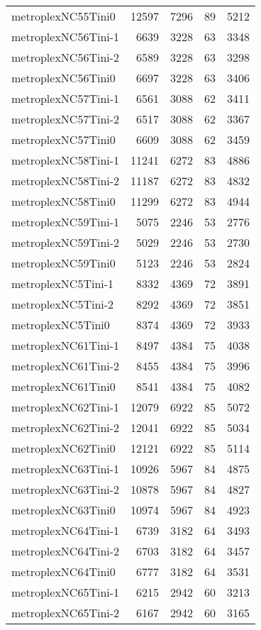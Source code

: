 \begin{longtable}{lrrrr}
metroplexNC55Tini0 & 12597 & 7296 & 89 & 5212 \\
metroplexNC56Tini-1 & 6639 & 3228 & 63 & 3348 \\
metroplexNC56Tini-2 & 6589 & 3228 & 63 & 3298 \\
metroplexNC56Tini0 & 6697 & 3228 & 63 & 3406 \\
metroplexNC57Tini-1 & 6561 & 3088 & 62 & 3411 \\
metroplexNC57Tini-2 & 6517 & 3088 & 62 & 3367 \\
metroplexNC57Tini0 & 6609 & 3088 & 62 & 3459 \\
metroplexNC58Tini-1 & 11241 & 6272 & 83 & 4886 \\
metroplexNC58Tini-2 & 11187 & 6272 & 83 & 4832 \\
metroplexNC58Tini0 & 11299 & 6272 & 83 & 4944 \\
metroplexNC59Tini-1 & 5075 & 2246 & 53 & 2776 \\
metroplexNC59Tini-2 & 5029 & 2246 & 53 & 2730 \\
metroplexNC59Tini0 & 5123 & 2246 & 53 & 2824 \\
metroplexNC5Tini-1 & 8332 & 4369 & 72 & 3891 \\
metroplexNC5Tini-2 & 8292 & 4369 & 72 & 3851 \\
metroplexNC5Tini0 & 8374 & 4369 & 72 & 3933 \\
metroplexNC61Tini-1 & 8497 & 4384 & 75 & 4038 \\
metroplexNC61Tini-2 & 8455 & 4384 & 75 & 3996 \\
metroplexNC61Tini0 & 8541 & 4384 & 75 & 4082 \\
metroplexNC62Tini-1 & 12079 & 6922 & 85 & 5072 \\
metroplexNC62Tini-2 & 12041 & 6922 & 85 & 5034 \\
metroplexNC62Tini0 & 12121 & 6922 & 85 & 5114 \\
metroplexNC63Tini-1 & 10926 & 5967 & 84 & 4875 \\
metroplexNC63Tini-2 & 10878 & 5967 & 84 & 4827 \\
metroplexNC63Tini0 & 10974 & 5967 & 84 & 4923 \\
metroplexNC64Tini-1 & 6739 & 3182 & 64 & 3493 \\
metroplexNC64Tini-2 & 6703 & 3182 & 64 & 3457 \\
metroplexNC64Tini0 & 6777 & 3182 & 64 & 3531 \\
metroplexNC65Tini-1 & 6215 & 2942 & 60 & 3213 \\
metroplexNC65Tini-2 & 6167 & 2942 & 60 & 3165 \\

\end{longtable}
